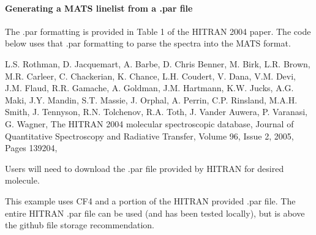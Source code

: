 \documentclass[letterpaper,10pt,english]{sphinxmanual}
\begin{document}
\sphinxAtStartPar
{}


\paragraph{Generating a MATS linelist from a .par file}
\label{\detokenize{HITRAN Line-by-Line Static Molecules:generating-a-mats-linelist-from-a-par-file}}
\sphinxAtStartPar
The .par formatting is provided in Table 1 of the HITRAN 2004 paper.  The code below uses that .par formatting to parse the spectra into the MATS format.

\sphinxAtStartPar
L.S. Rothman, D. Jacquemart, A. Barbe, D. Chris Benner, M. Birk, L.R. Brown, M.R. Carleer, C. Chackerian, K. Chance, L.H. Coudert, V. Dana, V.M. Devi, J.\sphinxhyphen{}M. Flaud, R.R. Gamache, A. Goldman, J.\sphinxhyphen{}M. Hartmann, K.W. Jucks, A.G. Maki, J.\sphinxhyphen{}Y. Mandin, S.T. Massie, J. Orphal, A. Perrin, C.P. Rinsland, M.A.H. Smith, J. Tennyson, R.N. Tolchenov, R.A. Toth, J. Vander Auwera, P. Varanasi, G. Wagner, The HITRAN 2004 molecular spectroscopic database, Journal of Quantitative Spectroscopy and Radiative Transfer, Volume 96, Issue 2, 2005, Pages 139\sphinxhyphen{}204, 

\sphinxAtStartPar
Users will need to download the .par file provided by HITRAN for desired molecule.

\sphinxAtStartPar
This example uses CF4 and a portion of the HITRAN provided .par file. The entire HITRAN .par file can be used (and has been tested locally), but is above the github file storage recommendation.
\end{document}

